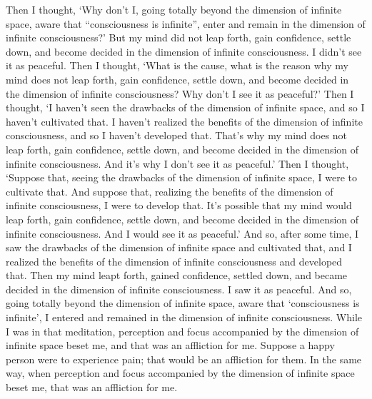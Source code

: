 \documentclass[12pt,openany]{book}%
\begin{document}
Then I thought, ‘Why don’t I, going totally beyond the dimension of infinite space, aware that “consciousness is infinite”, enter and remain in the dimension of infinite consciousness?’ But my mind did not leap forth, gain confidence, settle down, and become decided in the dimension of infinite consciousness. I didn’t see it as peaceful. Then I thought, ‘What is the cause, what is the reason why my mind does not leap forth, gain confidence, settle down, and become decided in the dimension of infinite consciousness? Why don’t I see it as peaceful?’ Then I thought, ‘I haven’t seen the drawbacks of the dimension of infinite space, and so I haven’t cultivated that. I haven’t realized the benefits of the dimension of infinite consciousness, and so I haven’t developed that. That’s why my mind does not leap forth, gain confidence, settle down, and become decided in the dimension of infinite consciousness. And it’s why I don’t see it as peaceful.’ Then I thought, ‘Suppose that, seeing the drawbacks of the dimension of infinite space, I were to cultivate that. And suppose that, realizing the benefits of the dimension of infinite consciousness, I were to develop that. It’s possible that my mind would leap forth, gain confidence, settle down, and become decided in the dimension of infinite consciousness. And I would see it as peaceful.’ And so, after some time, I saw the drawbacks of the dimension of infinite space and cultivated that, and I realized the benefits of the dimension of infinite consciousness and developed that. Then my mind leapt forth, gained confidence, settled down, and became decided in the dimension of infinite consciousness. I saw it as peaceful. And so, going totally beyond the dimension of infinite space, aware that ‘consciousness is infinite’, I entered and remained in the dimension of infinite consciousness. While I was in that meditation, perception and focus accompanied by the dimension of infinite space beset me, and that was an affliction for me. Suppose a happy person were to experience pain; that would be an affliction for them. In the same way, when perception and focus accompanied by the dimension of infinite space beset me, that was an affliction for me. 
\end{document}
